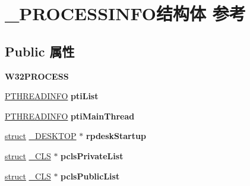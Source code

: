 \hypertarget{struct___p_r_o_c_e_s_s_i_n_f_o}{}\section{\+\_\+\+P\+R\+O\+C\+E\+S\+S\+I\+N\+F\+O结构体 参考}
\label{struct___p_r_o_c_e_s_s_i_n_f_o}
\subsection*{Public 属性}
\begin{DoxyCompactItemize}
\item 
\mbox{\label{struct___p_r_o_c_e_s_s_i_n_f_o_a7ad8852e46f8c7a2f8c1246395bfd3a6}} 
{\bfseries W32\+P\+R\+O\+C\+E\+SS}
\item 
\mbox{\label{struct___p_r_o_c_e_s_s_i_n_f_o_abcc28122c6c6ce47a700961035a12fb3}} 
\hyperlink{struct___t_h_r_e_a_d_i_n_f_o}{P\+T\+H\+R\+E\+A\+D\+I\+N\+FO} {\bfseries pti\+List}
\item 
\mbox{\label{struct___p_r_o_c_e_s_s_i_n_f_o_af53739d93ab763c5ec848bc421a7566e}} 
\hyperlink{struct___t_h_r_e_a_d_i_n_f_o}{P\+T\+H\+R\+E\+A\+D\+I\+N\+FO} {\bfseries pti\+Main\+Thread}
\item 
\mbox{\label{struct___p_r_o_c_e_s_s_i_n_f_o_ac8ab6c0294fcaed76368efc6ec3a3a57}} 
\hyperlink{interfacestruct}{struct} \hyperlink{struct___d_e_s_k_t_o_p}{\+\_\+\+D\+E\+S\+K\+T\+OP} $\ast$ {\bfseries rpdesk\+Startup}
\item 
\mbox{\label{struct___p_r_o_c_e_s_s_i_n_f_o_a82deb8de57b137a8487b8abc1651c17c}} 
\hyperlink{interfacestruct}{struct} \hyperlink{struct___c_l_s}{\+\_\+\+C\+LS} $\ast$ {\bfseries pcls\+Private\+List}
\item 
\mbox{\label{struct___p_r_o_c_e_s_s_i_n_f_o_ac4a2643345cde5fc050634e9a4ac6885}} 
\hyperlink{interfacestruct}{struct} \hyperlink{struct___c_l_s}{\+\_\+\+C\+LS} $\ast$ {\bfseries pcls\+Public\+List}
\item 
\mbox{\label{struct___p_r_o_c_e_s_s_i_n_f_o_a117f3398396151b9a3cc8fc7c802fd2d}} 

\end{DoxyCompactItemize}
